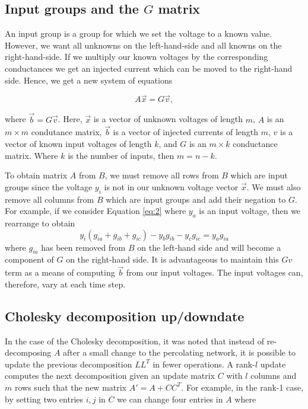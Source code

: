 \documentclass[11pt]{article}
\begin{document}
\subsection{Input groups and the $G$ matrix}
An input group is a group for which we set the voltage to a known value. However, we want all unknowns on the left-hand-side and all knowns on the right-hand-side. If we multiply our known voltages by the corresponding conductances we get an injected current which can be moved to the right-hand side. Hence, we get a new system of equations

\begin{equation}\label{eq:3}
    A\vec x = G \vec v,
\end{equation}

where $\vec b = G \vec v$. Here, $\vec x$ is a vector of unknown voltages of length $m$, $A$ is an $m\times m$ condutance matrix, $\vec b$ is a vector of injected currents of length $m$, $v$ is a vector of known input voltages of length $k$, and $G$ is an $m\times k$ conductance matrix. Where $k$ is the number of inputs, then $m=n-k$.

To obtain matrix $A$ from $B$, we must remove all rows from $B$ which are input groups since the voltage $y_i$ is not in our unknown voltage vector $\vec x$. We must also remove all columns from $B$ which are input groups and add their negation to $G$. For example, if we consider Equation \ref{eq:2} where $y_a$ is an input voltage, then we rearrange to obtain
\begin{equation}\label{eq:4}
    y_i (g_{ia} + g_{ib} + g_{ic}) - y_b g_{ib} - y_c g_{ic} = y_a g_{ia}
\end{equation}
where $g_{ia}$ has been removed from $B$ on the left-hand side and will become a component of $G$ on the right-hand side. It is advantageous to maintain this $G v$ term as a means of computing $\vec b$ from our input voltages. The input voltages can, therefore, vary at each time step.

\subsection{Cholesky decomposition up/downdate}
In the case of the Cholesky decomposition, it was noted that instead of re-decomposing $A$ after a small change to the percolating network, it is possible to update the previous decomposition $LL^T$ in fewer operations. A rank-$l$ update computes the next decomposition given an update matrix $C$ with $l$ columns and $m$ rows such that the new matrix $A'=A+CC^T$. For example, in the rank-1 case, by setting two entries $i, j$ in $C$ we can change four entries in $A$ where
\end{document}

